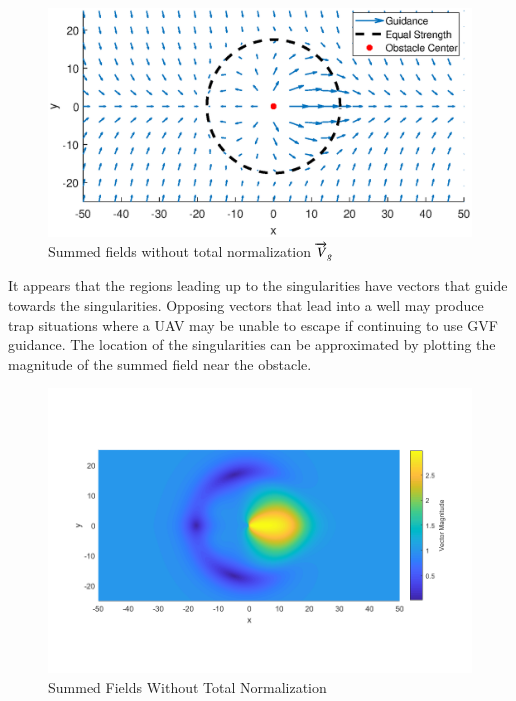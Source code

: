 \documentclass[numbered,pdftex]{ohio-etd}
\begin{document}
\begin{figure}[H]
	\centering
	\includegraphics[trim=25 35 25 50,clip,width=14cm]{PaperFigures/Methods/summedFieldsNoNorm}
	\caption{Summed fields without total normalization $\protect \overrightarrow{V}_g$}
	\label{fig:summedFieldsNoNorm}
\end{figure}

It appears that the regions leading up to the singularities have vectors that guide towards the singularities. Opposing vectors that lead into a well may produce trap situations where a UAV may be unable to escape if continuing to use GVF guidance. The location of the singularities can be approximated by plotting the magnitude of the summed field near the obstacle. 

\begin{figure}[H]
	\centering
	\includegraphics[trim=25 60 25 85,clip,width=14cm]{Figures/methods/summedHeatMapSimple}
	\caption{Summed Fields Without Total Normalization}
	\label{fig:summedHeatMap}
\end{figure}
\end{document}
